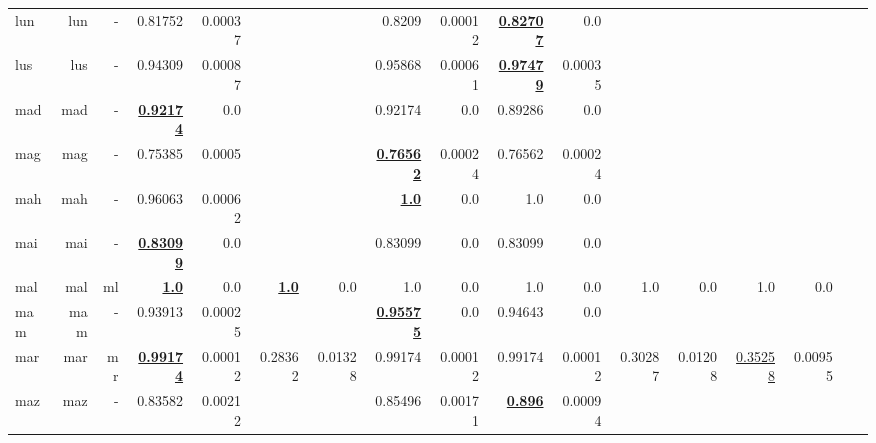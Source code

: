 \documentclass[11pt]{article}
\begin{document}
\begin{table*}[h]
{\begin{tabular}{lrrrrrrrrrrrrrrrr}
lun         & lun         & -         & 0.81752         & 0.00037         &          &          & 0.8209         & 0.00012         & \textbf{\underline{0.82707}}         & 0.0         &          &          &          &          \\
lus         & lus         & -         & 0.94309         & 0.00087         &          &          & 0.95868         & 0.00061         & \textbf{\underline{0.97479}}         & 0.00035         &          &          &          &          \\
mad         & mad         & -         & \textbf{\underline{0.92174}}         & 0.0         &          &          & 0.92174         & 0.0         & 0.89286         & 0.0         &          &          &          &          \\
mag         & mag         & -         & 0.75385         & 0.0005         &          &          & \textbf{\underline{0.76562}}         & 0.00024         & 0.76562         & 0.00024         &          &          &          &          \\
mah         & mah         & -         & 0.96063         & 0.00062         &          &          & \textbf{\underline{1.0}}         & 0.0         & 1.0         & 0.0         &          &          &          &          \\
mai         & mai         & -         & \textbf{\underline{0.83099}}         & 0.0         &          &          & 0.83099         & 0.0         & 0.83099         & 0.0         &          &          &          &          \\
mal         & mal         & ml         & \textbf{\underline{1.0}}         & 0.0         & \textbf{\underline{1.0}}         & 0.0         & 1.0         & 0.0         & 1.0         & 0.0         & 1.0         & 0.0         & 1.0         & 0.0         \\
mam         & mam         & -         & 0.93913         & 0.00025         &          &          & \textbf{\underline{0.95575}}         & 0.0         & 0.94643         & 0.0         &          &          &          &          \\
mar         & mar         & mr         & \textbf{\underline{0.99174}}         & 0.00012         & 0.28362         & 0.01328         & 0.99174         & 0.00012         & 0.99174         & 0.00012         & 0.30287         & 0.01208         & \underline{0.35258}         & 0.00955         \\
maz         & maz         & -         & 0.83582         & 0.00212         &          &          & 0.85496         & 0.00171         & \textbf{\underline{0.896}}         & 0.00094         &          &          &          &          \\

\end{tabular}}
\end{table*}
\end{document}
